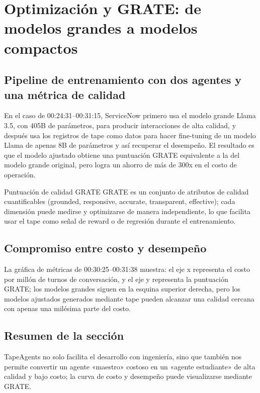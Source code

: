 \section{Optimización y GRATE: de modelos grandes a modelos compactos}
\subsection{Pipeline de entrenamiento con dos agentes y una métrica de calidad}
En el caso de 00:24:31--00:31:15, ServiceNow primero usa el modelo grande Llama 3.5, con 405B de parámetros, para producir interacciones de alta calidad, y después usa los registros de tape como datos para hacer fine-tuning de un modelo Llama de apenas 8B de parámetros y así recuperar el desempeño. El resultado es que el modelo ajustado obtiene una puntuación GRATE equivalente a la del modelo grande original, pero logra un ahorro de más de 300x en el costo de operación.

\begin{knowledgebox}{Puntuación de calidad GRATE}
GRATE es un conjunto de atributos de calidad cuantificables (grounded, responsive, accurate, transparent, effective); cada dimensión puede medirse y optimizarse de manera independiente, lo que facilita usar el tape como señal de reward o de regresión durante el entrenamiento.
\end{knowledgebox}

\subsection{Compromiso entre costo y desempeño}
La gráfica de métricas de 00:30:25--00:31:38 muestra: el eje x representa el costo por millón de turnos de conversación, y el eje y representa la puntuación GRATE; los modelos grandes siguen en la esquina superior derecha, pero los modelos ajustados generados mediante tape pueden alcanzar una calidad cercana con apenas una milésima parte del costo.

\subsection{Resumen de la sección}
TapeAgents no solo facilita el desarrollo con ingeniería, sino que también nos permite convertir un agente «maestro» costoso en un «agente estudiante» de alta calidad y bajo costo; la curva de costo y desempeño puede visualizarse mediante GRATE.

